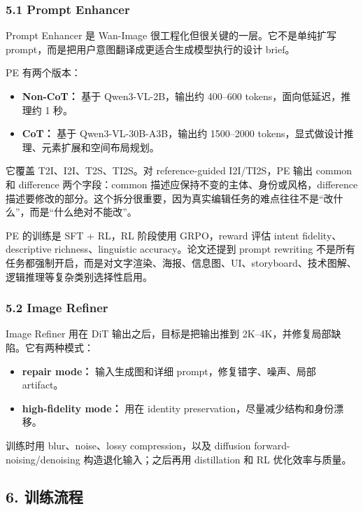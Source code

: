 \subsubsection{5.1 Prompt Enhancer}

Prompt Enhancer 是 Wan-Image 很工程化但很关键的一层。它不是单纯扩写 prompt，而是把用户意图翻译成更适合生成模型执行的设计 brief。

PE 有两个版本：

\begin{itemize}[leftmargin=1.5em]
  \item \textbf{Non-CoT：} 基于 Qwen3-VL-2B，输出约 400--600 tokens，面向低延迟，推理约 1 秒。
  \item \textbf{CoT：} 基于 Qwen3-VL-30B-A3B，输出约 1500--2000 tokens，显式做设计推理、元素扩展和空间布局规划。
\end{itemize}

它覆盖 T2I、I2I、T2S、TI2S。对 reference-guided I2I/TI2S，PE 输出 common 和 difference 两个字段：common 描述应保持不变的主体、身份或风格，difference 描述要修改的部分。这个拆分很重要，因为真实编辑任务的难点往往不是“改什么”，而是“什么绝对不能改”。

PE 的训练是 SFT + RL，RL 阶段使用 GRPO，reward 评估 intent fidelity、descriptive richness、linguistic accuracy。论文还提到 prompt rewriting 不是所有任务都强制开启，而是对文字渲染、海报、信息图、UI、storyboard、技术图解、逻辑推理等复杂类别选择性启用。

\subsubsection{5.2 Image Refiner}

Image Refiner 用在 DiT 输出之后，目标是把输出推到 2K--4K，并修复局部缺陷。它有两种模式：

\begin{itemize}[leftmargin=1.5em]
  \item \textbf{repair mode：} 输入生成图和详细 prompt，修复错字、噪声、局部 artifact。
  \item \textbf{high-fidelity mode：} 用在 identity preservation，尽量减少结构和身份漂移。
\end{itemize}

训练时用 blur、noise、lossy compression，以及 diffusion forward-noising/denoising 构造退化输入；之后再用 distillation 和 RL 优化效率与质量。

\subsection{6. 训练流程}

